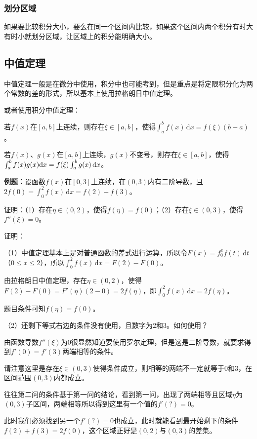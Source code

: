 \documentclass[UTF8, 12pt]{ctexart}
\begin{document}
\subsubsection{划分区域}

如果要比较积分大小，要么在同一个区间内比较，如果这个区间内两个积分有时大有时小就划分区域，让区域上的积分能明确大小。

\subsection{中值定理}

中值定理一般是在微分中使用，积分中也可能考到，但是重点是将定限积分化为两个常数的差的形式，所以基本上使用拉格朗日中值定理。

或者使用积分中值定理：

若$f(x)$在$[a,b]$上连续，则存在$\xi\in[a,b]$，使得$\int_a^bf(x)\,\textrm{d}x=f(\xi)(b-a)$。

若$f(x)$、$g(x)$在$[a,b]$上连续，$g(x)$不变号，则存在$\xi\in[a,b]$，使得$\int_a^bf(x)g(x)\,\\\textrm{d}x=f(\xi)\int_a^bg(x)\,\textrm{d}x$。

\textbf{例题：}设函数$f(x)$在$[0,3]$上连续，在$(0,3)$内有二阶导数，且$2f(0)=\int_0^2f(x)\,\textrm{d}x=f(2)+f(3)$。

证明：（1）存在$\eta\in(0,2)$，使得$f(\eta)=f(0)$；（2）存在$\xi\in(0,3)$，使得$f''(\xi)=0$。

证明：

（1）中值定理基本上是对普通函数的差式进行运算，所以令$F(x)=f_0^xf(t)\,\textrm{d}t$（$0\leqslant x\leqslant2$），所以$\int_0^2f(x)\,\textrm{d}x=F(2)-F(0)$。

由拉格朗日中值定理，存在$\eta\in(0,2)$，使得$F(2)-F(0)=F'(\eta)(2-0)=2f(\eta)$，即$\int_0^2f(x)\,\textrm{d}x=2f(\eta)$。

题目条件可知$f(\eta)=f(0)$。

（2）还剩下等式右边的条件没有使用，且数字为2和3。如何使用？

由函数导数$f''(\xi)$为0很显然知道要使用罗尔定理，但是这是二阶导数，就要求得到$f'(0)=f'(3)$两端相等的条件。

请注意这里是存在$\xi\in(0,3)$使得条件成立，则相等的两端不一定就等于0和3，在区间范围$(0,3)$内都成立。

往往第二问的条件基于第一问的结论，看到第一问，出现了两端相等且区域$\eta$为$(0,3)$子区间，两端相等所以得到这里有一个值的$f'(?)=0$。

此时我们必须找到另一个$f'(?)=0$也成立，此时就能看到最开始剩下的条件$f(2)+f(3)=2f(0)$，这个区域正好是$(0,2)$与$(0,3)$的差集。
\end{document}
